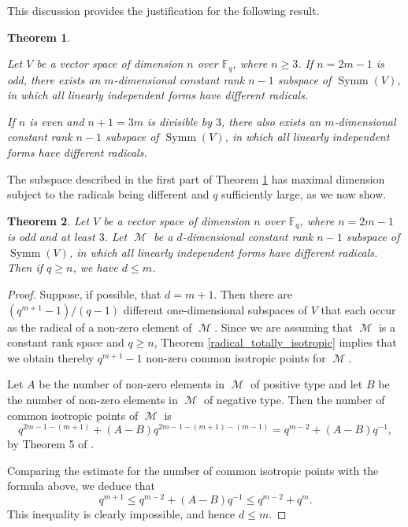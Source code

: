 \documentclass{amsart}
\DeclareMathOperator{\M}{\mathcal{M}}
\DeclareMathOperator{\Symm}{Symm}
\theoremstyle{plain}
\newtheorem{theorem}{Theorem}
\theoremstyle{definition}
\begin{document}
This discussion provides the justification for the following result.

\begin{theorem} \label{different_radicals}
 
Let $V$ be a vector space of dimension $n$ over $\mathbb{F}_q$, where $n\geq 3$. If $n=2m-1$ is odd, there exists an $m$-dimensional constant rank 
$n-1$ subspace of $\Symm(V)$, in which all linearly independent forms have different radicals. 

If $n$ is even and $n+1=3m$ is divisible by $3$, there also exists an $m$-dimensional constant rank 
$n-1$ subspace of $\Symm(V)$, in which all linearly independent forms have different radicals. 
\end{theorem}

The subspace described in the first part of Theorem \ref{different_radicals} has maximal dimension subject to the radicals being different
and $q$ sufficiently large, as we now show.

\begin{theorem} \label{maximum_dimension_different_radicals}
 Let $V$ be a vector space of dimension $n$ over $\mathbb{F}_q$, where $n=2m-1$ is odd and at least $3$. 
Let $\M$ be a $d$-dimensional constant rank 
$n-1$ subspace of $\Symm(V)$, in which all linearly independent forms have different radicals. Then if
$q\geq n$, we have $d\leq m$.

\end{theorem}

\begin{proof}
Suppose, if possible, that $d=m+1$. Then there are $(q^{m+1}-1)/(q-1)$ different one-dimensional subspaces of $V$ that each occur as
the radical of a non-zero element of $\M$. Since we are assuming that $\M$ is a constant rank space and $q\geq n$, Theorem \ref{radical_totally_isotropic} implies that we obtain thereby $q^{m+1}-1$ non-zero common isotropic points for $\M$. 

Let $A$ be the number of non-zero elements in $\M$ of positive type and let 
$B$ be the number of non-zero elements in $\M$ of negative type. Then the number of  
common isotropic points of $\M$ is
\[
q^{2m-1-(m+1)}+ (A-B)q^{2m-1-(m+1)-(m-1)}=q^{m-2}+(A-B)q^{-1},
\]
by Theorem 5 of \cite{DGS}. 

Comparing the estimate for the number of common isotropic points with the formula above, we deduce that
\[
 q^{m+1}\leq q^{m-2}+(A-B)q^{-1}\leq q^{m-2}+q^m.
\]
This inequality is clearly impossible, and hence $d\leq m$.

\end{proof}
\end{document}

